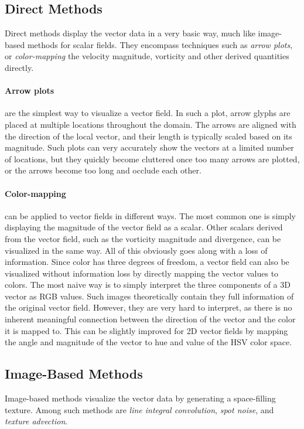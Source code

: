 %
\subsection{Direct Methods} %
\label{sub:direct_methods}
%
Direct methods display the vector data in a very basic way, much like
image-based methods for scalar fields.
%
They encompass techniques such as \emph{arrow plots}, or \emph{color-mapping}
the velocity magnitude, vorticity and other derived quantities directly.
%

%
\paragraph{Arrow plots} are the simplest way to visualize a vector field.
%
In such a plot, arrow glyphs are placed at multiple locations throughout the
domain.
%
The arrows are aligned with the direction of the local vector, and their
length is typically scaled based on its magnitude.
%
Such plots can very accurately show the vectors at a limited number of
locations, but they quickly become cluttered once too many arrows are plotted,
or the arrows become too long and occlude each other.
%

%
\paragraph{Color-mapping} can be applied to vector fields in different ways.
%
The most common one is simply displaying the magnitude of the vector field as a
scalar.
%
Other scalars derived from the vector field, such as the vorticity magnitude and
divergence, can be visualized in the same way.
%
All of this obviously goes along with a loss of information.
%
Since color has three degrees of freedom, a vector field can also be visualized
without information loss by directly mapping the vector values to colors.
%
The most naive way is to simply interpret the three components of a \ac{3D}
vector as RGB values.
%
Such images theoretically contain they full information of the original vector
field.
%
However, they are very hard to interpret, as there is no inherent meaningful
connection between the direction of the vector and the color it is mapped to.
%
This can be slightly improved for \ac{2D} vector fields by mapping the angle
and magnitude of the vector to hue and value of the HSV color space.
%
%
\subsection{Image-Based Methods} %
\label{sub:image_based_methods}
%
Image-based methods visualize the vector data by generating a space-filling
texture.
%
Among such methods are \emph{line integral convolution}, \emph{spot noise},
and \emph{texture advection}.
%

